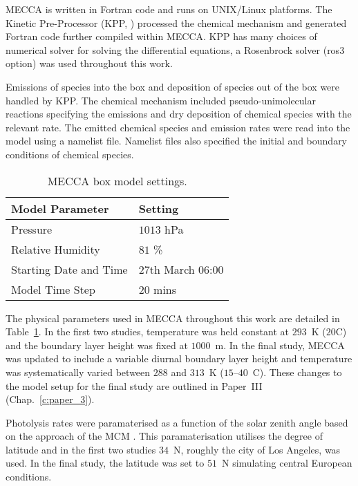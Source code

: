 MECCA is written in Fortran code and runs on UNIX/Linux platforms.
The Kinetic Pre-Processor (KPP, \citet{Damian:2002}) processed the chemical mechanism and generated Fortran code further compiled within MECCA.
KPP has many choices of numerical solver for solving the differential equations, a Rosenbrock solver (ros3 option) was used throughout this work.

Emissions of species into the box and deposition of species out of the box were handled by KPP.
The chemical mechanism included pseudo-unimolecular reactions specifying the emissions and dry deposition of chemical species with the relevant rate.
The emitted chemical species and emission rates were read into the model using a namelist file.  
Namelist files also specified the initial and boundary conditions of chemical species.

\begin{table}[t]%
    \begin{center}%
        \caption{MECCA box model settings.}%
        \begin{tabular}{ll}%
            \hline \hline
            \textbf{Model Parameter} & \textbf{Setting} \\
            \hline \hline
            Pressure & $1013$ hPa \\
            Relative Humidity & $81$ \% \\
            Starting Date and Time & 27th March 06:00 \\
            Model Time Step & $20$ mins \\
            \hline \hline
        \end{tabular}%
        \label{t:model_setup}%
    \end{center}%
\end{table}%
The physical parameters used in MECCA throughout this work are detailed in Table~\ref{t:model_setup}.
In the first two studies, temperature was held constant at $293$~K ($20$\degree C) and the boundary layer height was fixed at $1000$~m.
In the final study, MECCA was updated to include a variable diurnal boundary layer height and temperature was systematically varied between $288$ and $313$~K ($15$--$40$~\degree C).
These changes to the model setup for the final study are outlined in Paper~III (Chap.~\ref{c:paper_3}).

Photolysis rates were paramaterised as a function of the solar zenith angle based on the approach of the MCM \citep{Jenkin:1997}.
This paramaterisation utilises the degree of latitude and in the first two studies $34$~\degree N, roughly the city of Los Angeles, was used.
In the final study, the latitude was set to $51$~\degree N simulating central European conditions.

